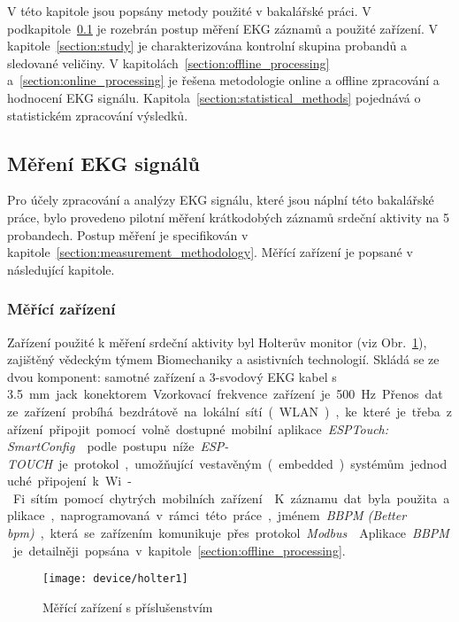 V této kapitole jsou popsány metody použité v bakalářské práci. V
podkapitole~\ref{section:measurement} je rozebrán postup měření EKG záznamů a
použité zařízení. V kapitole~\ref{section:study} je charakterizována kontrolní
skupina probandů a sledované veličiny. V
kapitolách~\ref{section:offline_processing} a~\ref{section:online_processing} je
řešena metodologie online a offline zpracování a hodnocení EKG signálu.
Kapitola~\ref{section:statistical_methods} pojednává o statistickém zpracování
výsledků.

\subsection{Měření EKG signálů}
\label{section:measurement}
Pro účely zpracování a analýzy EKG signálu, které jsou náplní této bakalářské
práce, bylo provedeno pilotní měření krátkodobých záznamů srdeční aktivity na 5
probandech. Postup měření je specifikován v
kapitole~\ref{section:measurement_methodology}. Měřící zařízení je popsané v
následující kapitole.

\subsubsection{Měřící zařízení}
\label{section:measurement_device}
Zařízení použité k měření srdeční aktivity byl Holterův monitor (viz
Obr.~\ref{fig:device}), zajištěný vědeckým týmem Biomechaniky a asistivních
technologií. Skládá se ze dvou komponent: samotné zařízení a 3-svodový EKG kabel
s 3.5~\si\mm~jack konektorem. Vzorkovací frekvence zařízení je 500~\si\Hz.

Přenos dat ze zařízení probíhá bezdrátově na lokální sítí (WLAN), ke které je
třeba zařízení připojit pomocí volně dostupné mobilní aplikace \textit{ESPTouch:
SmartConfig}~\cite{ESPAPP} podle postupu níže. \textit{ESP-TOUCH} je protokol, umožňující
vestavěným (embedded) systémům jednoduché připojení k Wi-Fi sítím pomocí
chytrých mobilních zařízení~\cite{esptouch}. K záznamu dat byla použita
aplikace, naprogramovaná v rámci této práce, jménem \textit{BBPM (Better bpm)},
která se zařízením komunikuje přes protokol \textit{Modbus}~\cite{modbus}.
Aplikace \textit{BBPM} je detailněji popsána v
kapitole~\ref{section:offline_processing}.

\begin{figure}[H]
    \begin{center}
        \texttt{[image: device/holter1]}
        \caption{Měřící zařízení s příslušenstvím}
        \label{fig:device}
    \end{center}
\end{figure}

